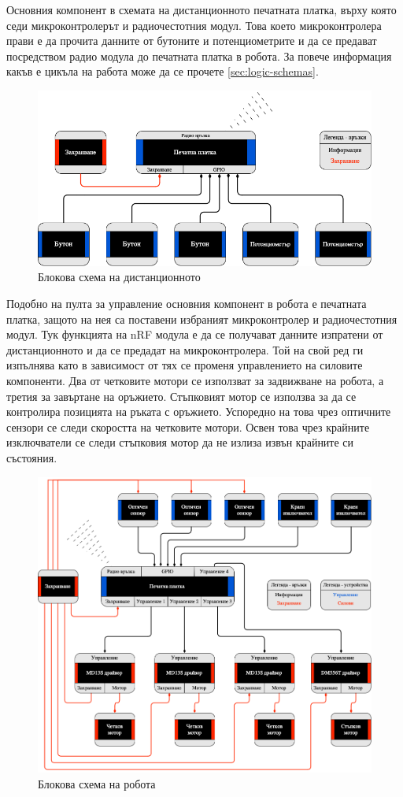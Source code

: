 Основния компонент в схемата на дистанционното печатната платка, върху която седи микроконтролерът и радиочестотния модул. Това което микроконтролера прави е да прочита данните от бутоните и потенциометрите и да се предават посредством радио модула до печатната платка в робота. За повече информация какъв е цикъла на работа може да се прочете \cref{sec:logic-schemas}.

\begin{figure}[H]
    \centering
    \includegraphics[width=\linewidth]{images/block-schema-controller.png}
    
    \caption{Блокова схема на дистанционното}
    \label{fig:block-controller} 
\end{figure}

Подобно на пулта за управление основния компонент в робота е печатната платка, защото на нея са поставени избраният микроконтролер и радиочестотния модул. Тук функцията на nRF модула е да се получават данните изпратени от дистанционното и да се предадат на микроконтролера. Той на свой ред ги изпълнява като в зависимост от тях се променя управлението на силовите компоненти. Два от четковите мотори се използват за задвижване на робота, а третия за завъртане на оръжието. Стъпковият мотор се използва за да се контролира позицията на ръката с оръжието. Успоредно на това чрез оптичните сензори се следи скоростта на четковите мотори. Освен това чрез крайните изключватели се следи стъпковия мотор да не излиза извън крайните си състояния.

\begin{figure}[H]
    \centering
    \includegraphics[width=\linewidth]{images/block-schema-robot.png}
    
    \caption{Блокова схема на робота}
    \label{fig:block-robot} 
\end{figure}